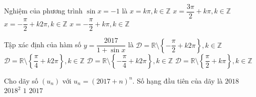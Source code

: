 \begin{ex}%
	Nghiệm của phương trình $\sin x=-1$ là
	\choice
	{$x=k\pi,k\in\mathbb{Z}$}
	{$x=\dfrac{3\pi}{2}+k\pi,k\in\mathbb{Z}$}
	{\True $x=-\dfrac{\pi}{2}+k2\pi,k\in\mathbb{Z}$}
	{$x=-\dfrac{\pi}{2}+k\pi,k\in\mathbb{Z}$}
\end{ex}
\begin{ex}%
	Tập xác định của hàm số $y=\dfrac{2017}{1+\sin x}$ là
	\choice
	{\True $\mathscr{D}=\mathbb{R}\setminus\left\lbrace -\dfrac{\pi}{2}+k2\pi\right\rbrace,k\in\mathbb{Z}$}
	{$\mathscr{D}=\mathbb{R}\setminus\left\lbrace \dfrac{\pi}{4}+k2\pi\right\rbrace,k\in\mathbb{Z}$}
	{$\mathscr{D}=\mathbb{R}\setminus\left\lbrace -\dfrac{\pi}{4}+k2\pi\right\rbrace,k\in\mathbb{Z}$}
	{$\mathscr{D}=\mathbb{R}\setminus\left\lbrace \dfrac{\pi}{2}+k\pi\right\rbrace,k\in\mathbb{Z}$}
\end{ex}
\begin{ex}%
	Cho dãy số $(u_n)$ với $u_n=(2017+n)^n$. Số hạng đầu tiên của dãy là
	\choice
	{\True $2018$}
	{$2018^2$}
	{$1$}
	{$2017$}
\end{ex}

